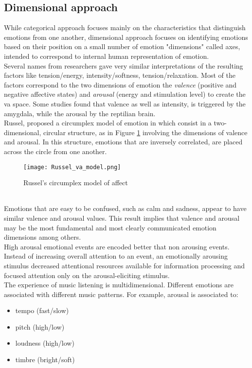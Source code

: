 \subsection{Dimensional approach} \label{dimensional_approach}
While categorical approach focuses mainly on the characteristics that distinguish emotions from one another, dimensional approach focuses on identifying emotions based on their position on a small number of emotion "dimensions" called axes, intended to correspond to internal human representation of emotion.
\\ \indent
Several names from researchers gave very similar interpretations of the resulting factors like tension/energy, intensity/softness, tension/relaxation. Most of the factors correspond to the two dimensions of emotion the \textit{valence} (positive and negative affective states) and \textit{arousal} (energy and stimulation level) to create the \gls{va} space. Some studies found that valence as well as intensity, is triggered by the amygdala, while the arousal by the reptilian brain.
\\
Russel, proposed a circumplex model of emotion in \cite{russell1980circumplex} which consist in a two-dimensional, circular structure, as in Figure \ref{fig:Russel_va_model} involving the dimensions of valence and arousal. In this structure, emotions that are inversely correlated, are placed across the circle from one another.
\begin{figure}[h]
    \centering
    \texttt{[image: Russel\_va\_model.png]} 
	\caption{Russel's circumplex model of affect}
    \label{fig:Russel_va_model}
\end{figure}
\\ \indent
Emotions that are easy to be confused, such as calm and sadness, appear to have similar valence and arousal values. This result implies that valence and arousal may be the most fundamental and most clearly communicated emotion dimensions among others.
\\
High arousal emotional events are encoded better that non arousing events. Instead of increasing overall attention to an event, an emotionally arousing stimulus decreased attentional resources available for information processing and focused attention only on the arousal-eliciting stimulus.
\\ \indent
The experience of music listening is multidimensional. Different emotions are associated with different music patterns. For example, arousal is associated to:
\begin{itemize}
	\item tempo (fast/slow)
	\item pitch (high/low)
	\item loudness (high/low)
	\item timbre (bright/soft)
\end{itemize}
